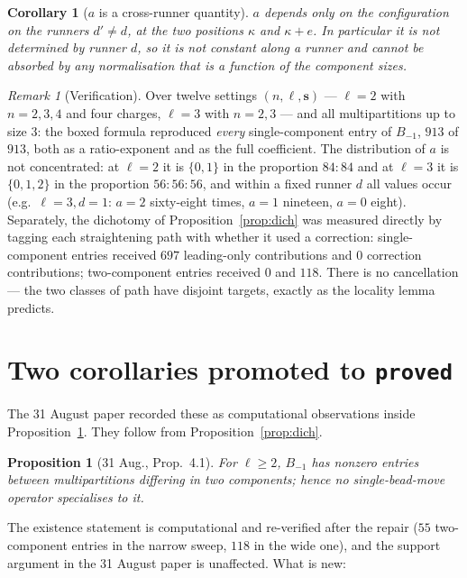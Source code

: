 \documentclass[11pt]{article}
\newtheorem{proposition}[theorem]{Proposition}
\newtheorem{corollary}[theorem]{Corollary}
\theoremstyle{definition}
\theoremstyle{remark}
\newtheorem{remark}[theorem]{Remark}
\newcommand{\bs}{\mathbf{s}}
\begin{document}
\begin{corollary}[$a$ is a cross-runner quantity]\label{cor:cross}
$a$ depends only on the configuration on the runners $d'\neq d$, at the two positions
$\kappa$ and $\kappa+e$. In particular it is not determined by runner $d$, so it is not
constant along a runner and cannot be absorbed by any normalisation that is a function of
the component sizes.
\end{corollary}

\begin{remark}[Verification]\label{rem:verif-closed}
Over twelve settings $(n,\ell,\bs)$ --- $\ell=2$ with $n=2,3,4$ and four charges,
$\ell=3$ with $n=2,3$ --- and all multipartitions up to size $3$: the boxed formula
reproduced \emph{every} single-component entry of $B_{-1}$, $913$ of $913$, both as a
ratio-exponent and as the full coefficient. The distribution of $a$ is not concentrated:
at $\ell=2$ it is $\{0,1\}$ in the proportion $84{:}84$ and at $\ell=3$ it is
$\{0,1,2\}$ in the proportion $56{:}56{:}56$, and within a fixed runner $d$ all values
occur (e.g.\ $\ell=3,d=1$: $a=2$ sixty-eight times, $a=1$ nineteen, $a=0$ eight).
Separately, the dichotomy of Proposition~\ref{prop:dich} was measured directly by tagging
each straightening path with whether it used a correction: single-component entries
received $697$ leading-only contributions and $0$ correction contributions;
two-component entries received $0$ and $118$. There is no cancellation --- the two
classes of path have disjoint targets, exactly as the locality lemma predicts.
\end{remark}

\section{Two corollaries promoted to \texttt{proved}}\label{sec:promote}

The 31 August paper recorded these as computational observations inside
Proposition~\ref{prop:heis-old}. They follow from Proposition~\ref{prop:dich}.

\begin{proposition}[31 Aug., Prop.\ 4.1]\label{prop:heis-old}
For $\ell\ge2$, $B_{-1}$ has nonzero entries between multipartitions differing in two
components; hence no single-bead-move operator specialises to it.
\end{proposition}

\noindent The existence statement is computational and re-verified after the repair
($55$ two-component entries in the narrow sweep, $118$ in the wide one), and the support
argument in the 31 August paper is unaffected. What is new:
\end{document}
